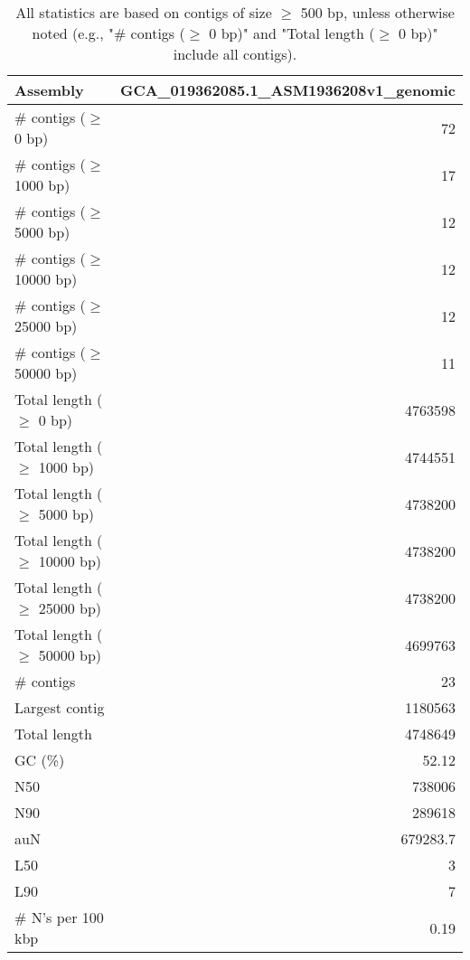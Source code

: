 \documentclass[12pt,a4paper]{article}
\begin{document}
\begin{table}[ht]
\begin{center}
\caption{All statistics are based on contigs of size $\geq$ 500 bp, unless otherwise noted (e.g., "\# contigs ($\geq$ 0 bp)" and "Total length ($\geq$ 0 bp)" include all contigs).}
\begin{tabular}{|l*{1}{|r}|}
\hline
Assembly & GCA\_019362085.1\_ASM1936208v1\_genomic \\ \hline
\# contigs ($\geq$ 0 bp) & 72 \\ \hline
\# contigs ($\geq$ 1000 bp) & 17 \\ \hline
\# contigs ($\geq$ 5000 bp) & 12 \\ \hline
\# contigs ($\geq$ 10000 bp) & 12 \\ \hline
\# contigs ($\geq$ 25000 bp) & 12 \\ \hline
\# contigs ($\geq$ 50000 bp) & 11 \\ \hline
Total length ($\geq$ 0 bp) & 4763598 \\ \hline
Total length ($\geq$ 1000 bp) & 4744551 \\ \hline
Total length ($\geq$ 5000 bp) & 4738200 \\ \hline
Total length ($\geq$ 10000 bp) & 4738200 \\ \hline
Total length ($\geq$ 25000 bp) & 4738200 \\ \hline
Total length ($\geq$ 50000 bp) & 4699763 \\ \hline
\# contigs & 23 \\ \hline
Largest contig & 1180563 \\ \hline
Total length & 4748649 \\ \hline
GC (\%) & 52.12 \\ \hline
N50 & 738006 \\ \hline
N90 & 289618 \\ \hline
auN & 679283.7 \\ \hline
L50 & 3 \\ \hline
L90 & 7 \\ \hline
\# N's per 100 kbp & 0.19 \\ \hline
\end{tabular}
\end{center}
\end{table}
\end{document}
